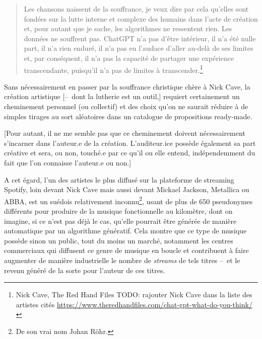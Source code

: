 \begin{quotation}
Les chansons naissent de la souffrance, je veux dire par cela qu'elles sont fondées sur la lutte interne et complexe des humains dans l'acte de création et, pour autant que je sache, les algorithmes ne ressentent rien. Les données ne souffrent pas. ChatGPT n'a pas d'être intérieur, il n'a été nulle part, il n'a rien enduré, il n'a pas eu l'audace d'aller au-delà de ses limites et, par conséquent, il n'a pas la capacité de partager une expérience transcendante, puisqu'il n'a pas de limites à transcender.\footnote{Nick Cave, The Red Hand Files TODO: rajouter Nick Cave dans la liste des artistes cités \url{https://www.theredhandfiles.com/chat-gpt-what-do-you-think/}}
\end{quotation}

Sans nécessairement en passer par la souffrance christique chère à Nick Cave, la création artistique [--~dont la lutherie est un outil,] requiert certainement un cheminement personnel (ou collectif) et des choix qu'on ne saurait réduire à de simples tirages au sort aléatoires dans un catalogue de propositions ready-made.

[Pour autant, il ne me semble pas que ce cheminement doivent nécessairement s'incarner dans l'auteur.e de la création. L'auditeur.ice possède également sa part créative et sera, ou non, touché.e par ce qu'il ou elle entend, indépendemment du fait que l'on connaisse l'auteur.e ou non.]




A cet égard, l'un des artistes le plus diffusé sur la plateforme de streaming Spotify, loin devant Nick Cave mais aussi devant Mickael Jackson, Metallica ou ABBA, est un suédois relativement inconnu\footnote{De son vrai nom Johan Röhr.}, usant de plus de 650 pseudonymes différents pour produire de la musique fonctionnelle au kilomètre, dont on imagine, si ce n'est pas déjà le cas, qu'elle pourrait être générée de manière automatique par un algorithme génératif. Cela montre que ce type de musique possède sinon un public, tout du moins un marché, notamment les centres commerciaux qui diffusent ce genre de musique en boucle et contribuent à faire augmenter de manière industrielle le nombre de \textit{streams} de tels titres --~et le revenu généré de la sorte pour l'auteur de ces titres.

